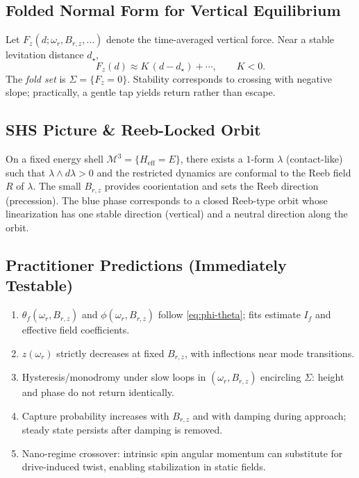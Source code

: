 \documentclass[11pt]{article}
\newcommand{\calM}{\mathcal{M}}
\theoremstyle{definition}
\theoremstyle{plain}
\begin{document}
\subsection{Folded Normal Form for Vertical Equilibrium}
Let \(F_z(d;\omega_r,B_{r,z},\ldots)\) denote the time-averaged vertical force. Near a stable levitation distance \(d_\star\),
\begin{equation}
  \label{eq:Fz-linear}
  F_z(d) \approx K\,(d-d_\star) + \cdots, \qquad K<0.
\end{equation}
The \emph{fold set} is \(\Sigma=\{F_z=0\}\). Stability corresponds to crossing with negative slope; practically, a gentle tap yields return rather than escape.

\subsection{SHS Picture \& Reeb-Locked Orbit}
On a fixed energy shell \(\calM^3=\{H_{\mathrm{eff}}=E\}\), there exists a \(1\)-form \(\lambda\) (contact-like) such that \(\lambda\wedge d\lambda>0\) and the restricted dynamics are conformal to the Reeb field \(R\) of \(\lambda\). The small \(B_{r,z}\) provides coorientation and sets the Reeb direction (precession). The blue phase corresponds to a closed Reeb-type orbit whose linearization has one stable direction (vertical) and a neutral direction along the orbit.

\subsection{Practitioner Predictions (Immediately Testable)}
\begin{enumerate}[leftmargin=1.5em,label=\textbf{P\arabic*.}]
  \item \(\theta_f(\omega_r,B_{r,z})\) and \(\phi(\omega_r,B_{r,z})\) follow \cref{eq:phi-theta}; fits estimate \(I_f\) and effective field coefficients.
  \item \(z(\omega_r)\) strictly decreases at fixed \(B_{r,z}\), with inflections near mode transitions.
  \item Hysteresis/monodromy under slow loops in \((\omega_r,B_{r,z})\) encircling \(\Sigma\): height and phase do not return identically.
  \item Capture probability increases with \(B_{r,z}\) and with damping during approach; steady state persists after damping is removed.
  \item Nano-regime crossover: intrinsic spin angular momentum can substitute for drive-induced twist, enabling stabilization in static fields.
\end{enumerate}
\end{document}
